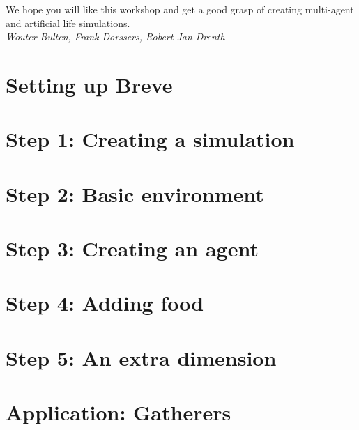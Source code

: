 \documentclass[a4paper,twoside,justified]{tufte-book}
\begin{document}
We hope you will like this workshop and get a good grasp of creating multi-agent and artificial life simulations.\\[1cm]

\textit{Wouter Bulten, Frank Dorssers, Robert-Jan Drenth}
\mainmatter
\chapter{Setting up Breve}


\chapter{Step 1:  Creating a simulation}


\chapter{Step 2: Basic environment}


\chapter{Step 3: Creating an agent}


\chapter{Step 4: Adding food}


\chapter{Step 5: An extra dimension}


\chapter{Application: Gatherers}





\end{document}
